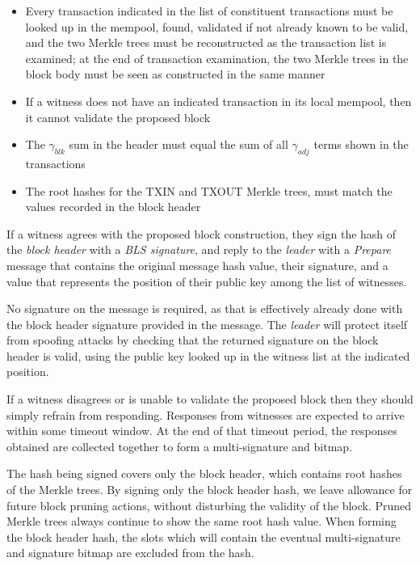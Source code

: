 \documentclass[a4paper, 10pt, conference]{ieeeconf}
\begin{document}
\begin{itemize}
{\begin{itemize}
			\item {Every transaction indicated in the list of constituent transactions must be looked up in the mempool, found, validated if not already known to be valid, and the two Merkle trees must be reconstructed as the transaction list is examined; at the end of transaction examination, the two Merkle trees in the block body must be seen as constructed in the same manner}
			\item {If a witness does not have an indicated transaction in its local mempool, then it cannot validate the proposed block}
			\item {The $\gamma_{blk}$ sum in the header must equal the sum of all $\gamma_{adj}$ terms shown in the transactions}
			\item {The root hashes for the TXIN and TXOUT Merkle trees, must match the values recorded in the block header}
		\end{itemize}

	\item{If a witness agrees with the proposed block construction, they sign the hash of the \textit{block header} with a \textit{BLS signature}, and reply to the \textit{leader} with a \textit{Prepare} message that contains the original message hash value, their signature, and a value that represents the position of their public key among the list of witnesses. 

	No signature on the message is required, as that is effectively already done with the block header signature provided in the message. The \textit{leader} will protect itself from spoofing attacks by checking that the returned signature on the block header is valid, using the public key looked up in the witness list at the indicated position.}

	\item{If a witness disagrees or is unable to validate the proposed block then they should simply refrain from responding. Responses from witnesses are expected to arrive within some timeout window. At the end of that timeout period, the responses obtained are collected together to form a multi-signature and bitmap.}

	\item{The hash being signed covers only the block header, which contains root hashes of the Merkle trees. By signing only the block header hash, we leave allowance for future block pruning actions, without disturbing the validity of the block. Pruned Merkle trees always continue to show the same root hash value. When forming the block header hash, the slots which will contain the eventual multi-signature and signature bitmap are excluded from the hash.}

}
\end{itemize}
\end{document}
